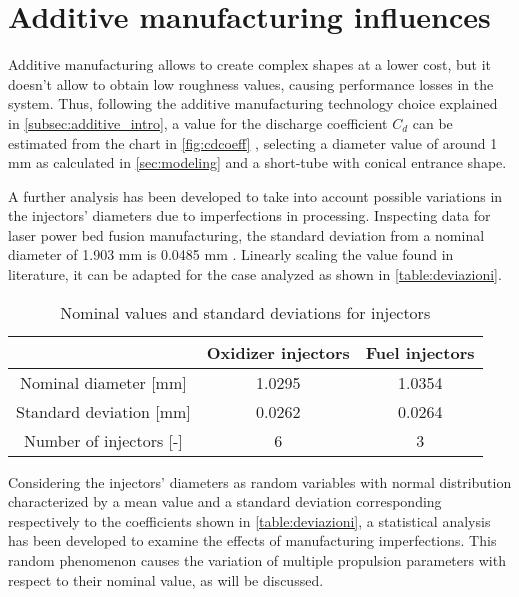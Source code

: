 \section{Additive manufacturing influences}
\label{sec:additive}

\label{cdcoeff}


Additive manufacturing allows to create complex shapes at a lower cost, but it doesn't allow to obtain low roughness values, causing performance losses in the system. Thus, following the additive manufacturing technology choice explained in \autoref{subsec:additive_intro}, a value for the discharge coefficient $C_d$ can be estimated from the chart in \autoref{fig:cdcoeff} \cite{valori_cd}, selecting a diameter value of around 1 mm as calculated in \autoref{sec:modeling} and a short-tube with conical entrance shape. 

A further analysis has been developed to take into account possible variations in the injectors' diameters due to imperfections in processing. Inspecting data for laser power bed fusion manufacturing, the standard deviation from a nominal diameter of 1.903 mm is 0.0485 mm \cite{lpbf_accuracy}. Linearly scaling the value found in literature, it can be adapted for the case analyzed as shown in \autoref{table:deviazioni}.


\vspace*{5mm}
\begin{table}[H]
    \renewcommand{\arraystretch}{1.5}
    \centering
    \begin{tabular}{|c|c|c|}
        \hline
         & \textbf{Oxidizer injectors} & \textbf{Fuel injectors}\\
        \hline
        \hline
        Nominal diameter [mm] & 1.0295 & 1.0354 \\ 
        \hline
        Standard deviation [mm] & 0.0262 & 0.0264 \\
        \hline
        Number of injectors [-] & 6 & 3 \\
        \hline
    \end{tabular}
    \caption{Nominal values and standard deviations for injectors}
    \label{table:deviazioni}
\end{table}


Considering the injectors' diameters as random variables with normal distribution characterized by a mean value and a standard deviation corresponding respectively to the coefficients shown in \autoref{table:deviazioni}, a statistical analysis has been developed to examine the effects of manufacturing imperfections. This random phenomenon causes the variation of multiple propulsion parameters with respect to their nominal value, as will be discussed.

